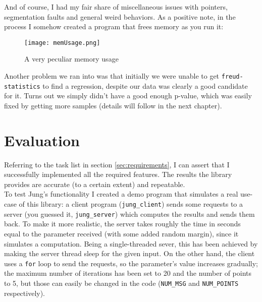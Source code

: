         And of course, I had my fair share of miscellaneous issues with pointers, segmentation faults and 
        general weird behaviors. As a positive note, in the process I somehow created a program that frees
        memory as you run it:

        \begin{figure}[H]
            \centering
            \texttt{[image: memUsage.png]}
            \caption{A very peculiar memory usage}
            \label{fig:memUsage}
        \end{figure}

        Another problem we ran into was that initially we were unable to get \texttt{freud-statistics} to find a
        regression, despite our data was clearly a good candidate for it. Turns out we simply didn't have a
        good enough p-value, which was easily fixed by getting more samples (details will follow in the next
        chapter).        


\chapter{Evaluation}


    Referring to the task list in section \ref{sec:requirements}, I can assert that I successfully implemented
    all the required features. The results the library provides are accurate (to a certain extent) and repeatable.\\

    To test Jung's functionality I created a demo program that simulates a real use-case of this library:
    a client program (\texttt{jung\_client}) sends some requests to a server (you guessed it, 
    \texttt{jung\_server}) which computes the results and sends them back. To make it more realistic,
    the server takes roughly the time in seconds equal to the parameter received (with some added
    random margin), since it simulates a computation. Being a single-threaded sever, this has been
    achieved by making the server thread sleep for the given input. On the other hand, the client
    uses a \texttt{for} loop to send the requests, so the parameter's value increases gradually;
    the maximum number of iterations has been set to 20 and the number of points to 5,
    but those can easily be changed in the code (\texttt{NUM\_MSG} and \texttt{NUM\_POINTS} respectively).\\

